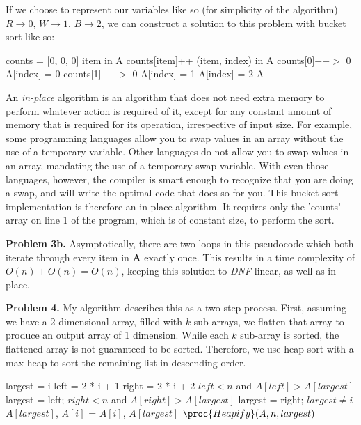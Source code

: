 \documentclass{article}
\begin{document}
If we choose to represent our variables like so (for simplicity of the algorithm) $R \rightarrow 0$, $W \rightarrow 1$, $B \rightarrow 2$, we can construct a solution to this problem with bucket sort like so:

\begin{codebox}
    \li counts = [0, 0, 0]
    \li
    \li \For item in A \Do
    \li counts[item]++ \End
    \li
    \li \For (item, index) in A \Do
    \li \If counts[0]$-- >$ 0 \Then
    \li A[index] = 0
    \li \ElseIf counts[1]$-- >$ 0 \Then
    \li A[index] = 1 
    \li \Else
    \li A[index] = 2 \End \End
    \li \Return A
\end{codebox}

An \emph{in-place} algorithm is an algorithm that does not need extra memory to perform whatever action is required of it, except for any constant amount of memory that is required for its operation, irrespective of input size. For example, some programming languages allow you to swap values in an array without the use of a temporary variable. Other languages do not allow you to swap values in an array, mandating the use of a temporary swap variable. With even those languages, however, the compiler is smart enough to recognize that you are doing a swap, and will write the optimal code that does so for you. This bucket sort implementation is therefore an in-place algorithm. It requires only the 'counts' array on line 1 of the program, which is of constant size, to perform the sort.

\textbf{Problem 3b.} Asymptotically, there are two loops in this pseudocode which both iterate through every item in $\pmb A$ exactly once. This results in a time complexity of $O(n) + O(n) = O(n)$, keeping this solution to \emph{DNF} linear, as well as in-place.

\hfill

\textbf{Problem 4.} My algorithm describes this as a two-step process. First, assuming we have a 2 dimensional array, filled with $k$ sub-arrays, we flatten that array to produce an output array of 1 dimension. While each $k$ sub-array is sorted, the flattened array is not guaranteed to be sorted. Therefore, we use heap sort \cite{website:4} with a max-heap to sort the remaining list in descending order. 

\begin{codebox}
    \li largest = i
    \li left = 2 * i + 1
    \li right = 2 * i + 2
    \li
    \li \If $left < n$ and $A[left] > A[largest]$
    \li \Then largest = left; \End
    \li
    \li \If $right < n$ and $A[right] > A[largest]$
    \li \Then largest = right; \End
    \li
    \li \If $largest \neq i$
    \li \Then $A[largest]$, $A[i]$ = $A[i]$, $A[largest]$
    \li $\proc{Heapify}(A, n, largest)$ \End
\end{codebox}
\end{document}
